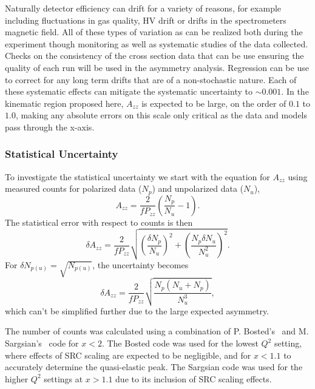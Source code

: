 Naturally detector efficiency can drift for a variety of reasons, for
example including fluctuations in gas quality, HV drift or
drifts in the spectrometers magnetic field.  All of these types of variation as can be realized both
during the experiment though monitoring as well as systematic studies of the data collected.
Checks on the consistency of the cross section data that can be use ensuring the quality of each run will be used in the asymmetry analysis.  Regression can be use to correct for any long term drifts that are of a non-stochastic nature.
Each of these systematic effects can mitigate the systematic uncertainty to $\sim0.001$. 
In the kinematic region proposed here, $A_{zz}$ is expected to be large, on the order of $0.1$ to $1.0$, making any absolute errors on this scale only critical as the data and models pass through the x-axis.  

\fi

\subsubsection{Statistical Uncertainty}
\label{stat}
To investigate the statistical uncertainty we start with the equation for $A_{zz}$ using
measured counts for polarized data ($N_p$) and unpolarized data ($N_u$), 
\begin{equation}
A_{zz}=\frac{2}{fP_{zz}}\left(\frac{N_p}{N_u}-1\right).
\end{equation}
The statistical error with respect to counts is then
\begin{equation}
\delta A_{zz}=\frac{2}{fP_{zz}}\sqrt{\left(\frac{\delta N_p}{N_u}\right)^2+\left(\frac{N_p\delta N_u}{N_u^2}\right)^2}.
\end{equation}
For $\delta N_{p(u)}=\sqrt{N_{p(u)}}$, the uncertainty becomes
\begin{equation}
\label{dAzz}
\delta A_{zz}=\frac{2}{fP_{zz}}\sqrt{\frac{N_p(N_u + N_p)}{N_u^3}},
\end{equation}
which can't be simplified further due to the large expected asymmetry.

The number of counts was calculated using a combination of P. Bosted's~\cite{Bosted:2012qc} and M. Sargsian's~\cite{misak-convo} code for $x<2$. The Bosted code was used for the lowest $Q^2$ setting, where effects of SRC scaling are expected to be negligible, and for $x<1.1$ to accurately determine the quasi-elastic peak. The Sargsian code was used for the higher $Q^2$ settings at $x>1.1$ due to its inclusion of SRC scaling effects.

